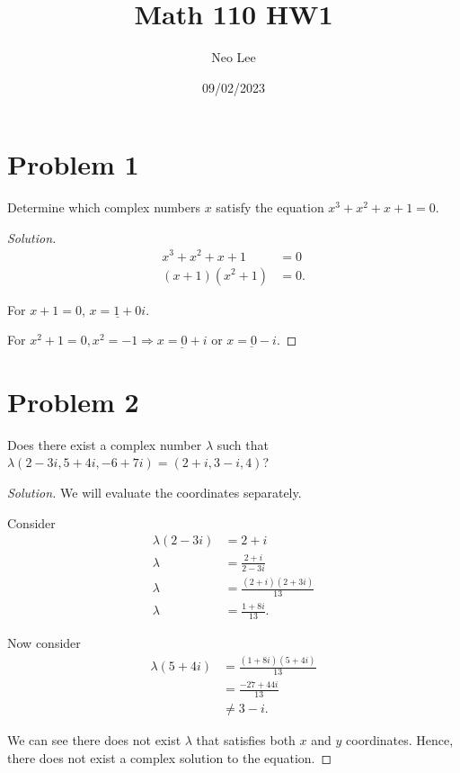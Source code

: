 \documentclass{article}
\title{Math 110 HW1}
\author{Neo Lee}
\date{09/02/2023}
\begin{document}
 

\maketitle 

\section*{Problem 1}
Determine which complex numbers $x$ satisfy the equation $x^3 + x^2 + x + 1 = 0$.
\begin{proof}[Solution]
    \begin{align*}
        x^3 + x^2 + x + 1 & = 0 \\
        (x+1)(x^2+1) & = 0.
    \end{align*}
    
    For $x + 1 = 0$, $\underline{x = 1 + 0i}$.

    For $x^2 + 1 = 0, x^2 = -1 \Rightarrow \underline{x = 0 + i}$ or $\underline{x = 0 - i}$. 
\end{proof}

\section*{Problem 2}
Does there exist a complex number $\lambda$ such that $\lambda (2-3i, 5+4i, -6+7i) = 
(2+i, 3-i, 4)$?
\begin{proof}[Solution]
    We will evaluate the coordinates separately.
    
    Consider
    \begin{align*}
        \lambda (2-3i) & = 2+i \\
        \lambda & = \frac{2+i}{2-3i} \\
        \lambda & = \frac{(2+i)(2+3i)}{13} \\
        \lambda & = \frac{1 + 8i}{13}.
    \end{align*}

    Now consider
    \begin{align*}
        \lambda (5+4i) & = \frac{(1+8i)(5+4i)}{13} \\
        & = \frac{-27 + 44i}{13} \\
        & \neq 3 - i.
    \end{align*}

    We can see there does not exist $\lambda$ that satisfies both $x$ and $y$ coordinates. Hence, 
    there does not exist a complex solution to the equation.
    
\end{proof}
\end{document}
